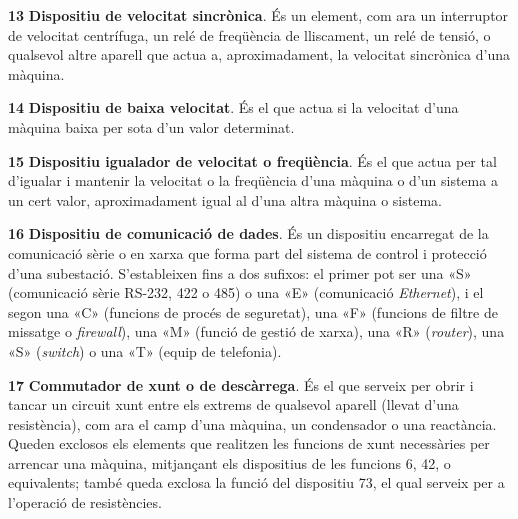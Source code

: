 \begin{multicols}{2}
\begin{list}{}
\item[\textbf{13}]   
\textbf{Dispositiu de velocitat sincrònica}. És un element, com ara un interruptor de
velocitat centrífuga, un relé de freqüència de lliscament, un relé
de tensió, o qualsevol altre aparell que actua a, aproximadament, la
velocitat sincrònica d'una màquina.


\item[\textbf{14}]   
\textbf{Dispositiu de baixa velocitat}. És el que actua si la velocitat d'una màquina baixa per sota d'un valor determinat.

\item[\textbf{15}]  
\textbf{Dispositiu igualador de velocitat o freqüència}. És el que
actua per tal d'igualar i mantenir la velocitat o la  freqüència
d'una màquina o d'un sistema a un cert valor, aproximadament igual
al  d'una altra màquina o sistema.

\item[\textbf{16}]  
\textbf{Dispositiu de comunicació de dades}. És un dispositiu encarregat de la comunicació sèrie o en xarxa que forma part del  sistema de control i protecció d'una subestació. S'estableixen fins a dos sufixos: el primer pot ser una «S» (comunicació sèrie RS-232, 422 o 485) o una «E» (comunicació \textit{Ethernet}), i el segon una «C» (funcions de procés de seguretat), una «F» (funcions de filtre de missatge o \textit{firewall}), una «M» (funció de gestió de xarxa), una  «R» (\textit{router}), una «S» (\textit{switch}) o una «T» (equip de telefonia).

\item[\textbf{17}]   
  
\textbf{Commutador de  xunt o de descàrrega}. És el que serveix per obrir i tancar
un circuit xunt entre els extrems de qualsevol aparell (llevat d'una resistència), com ara el camp d'una màquina, un condensador o
una reactància. Queden exclosos els elements que realitzen les
funcions de xunt necessàries per arrencar una màquina, mitjançant
els dispositius de les funcions 6, 42, o equivalents; també queda exclosa la funció
del dispositiu 73, el qual serveix per a l'operació de resistències.


\end{list}
\end{multicols}
